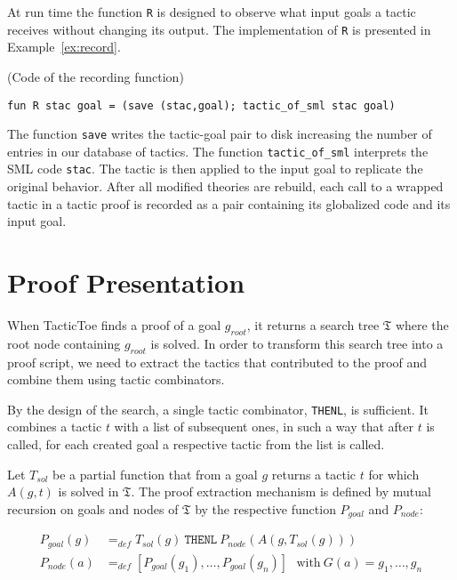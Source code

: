 \documentclass[runningheads,a4paper,draft]{svjour3}
\def\sml{\textsf{SML}\xspace}
\def\tactictoe{\textsf{TacticToe}\xspace}
\begin{document}
At run time the function \texttt{R} is designed to observe what input goals a
tactic  receives without changing its output. The implementation of \texttt{R}
is presented in Example~\ref{ex:record}.

\begin{example}\label{ex:record} (Code of the recording function)
\begin{lstlisting}[language=SMLSmall]
fun R stac goal = (save (stac,goal); tactic_of_sml stac goal)
\end{lstlisting}
\end{example}

The function \texttt{save} writes the tactic-goal pair to disk increasing the
number of entries in our database of tactics. The function
\texttt{tactic\_of\_sml} interprets the \sml code \texttt{stac}. The tactic is
then applied to the input goal to replicate the original behavior.
After all modified theories are rebuild, each call to a wrapped tactic in a
tactic proof is recorded as a pair containing its globalized code and its
input goal.



\section{Proof Presentation}\label{sec:proofdisplay}

When \tactictoe finds a proof of a goal $g_{root}$, it returns a search tree
$\mathfrak{T}$ where the root node containing $g_{root}$ is solved.
In order to transform this search tree into a proof script, we need to extract
the tactics that contributed to the proof and combine them using tactic
combinators.

By the design of the search, a single tactic combinator, \texttt{THENL}, is
sufficient. It combines a tactic $t$ with a list of subsequent ones, in such a
way that after $t$ is called, for each created goal a respective
tactic from the list is called.

Let $T_{sol}$ be a partial function that from a goal $g$ returns a tactic $t$
for which $A(g,t)$ is solved in $\mathfrak{T}$.
The proof extraction mechanism is defined by mutual
recursion on goals and nodes of $\mathfrak{T}$ by the respective function
$P_{goal}$ and $P_{node}$:

\begin{align*}
P_{goal}(g) &=_{def} T_{sol}(g)\ \texttt{THENL}\ P_{node}(A(g,T_{sol}(g)))\\
P_{node}(a) &=_{def} [P_{goal}(g_1),\ldots,P_{goal}(g_n)]\ \ \ \text{with}\
G(a) = g_1,\ldots,g_n\\
\end{align*}
\end{document}
